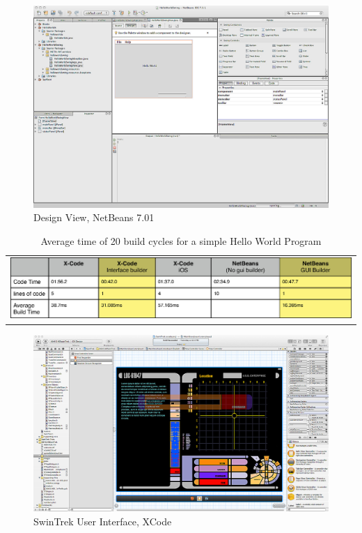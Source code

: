 \documentclass[a4paper,14pt]{article}
\begin{document}
\begin{figure}[H]
\centering
\includegraphics[scale=0.29]{netbeans.eps}
\caption{Design View, NetBeans 7.01}
\label{fig:netbeans}
\end{figure}

\begin{table}[here]
\centering
\begin{tabular}{l}
\includegraphics[scale=0.65]{TableBuildCompares.eps}
\end{tabular}
\caption{Average time of 20 build cycles for a simple Hello World Program}
\label{table:buildTimes}
\end{table}

\begin{figure}[H]
\centering
\includegraphics[scale=0.24]{swintrekuserinterface.eps}
\caption{SwinTrek User Interface, XCode}
\label{fig:swintrekui}
\end{figure}
\end{document}
